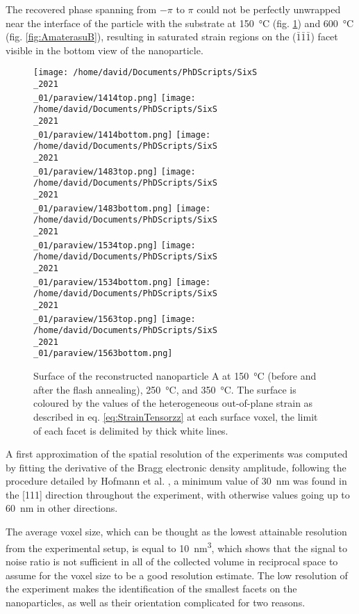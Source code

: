 The recovered phase spanning from $-\pi$ to $\pi$ could not be perfectly unwrapped near the interface of the particle with the substrate at \qty{150}{\degreeCelsius} (fig. \ref{fig:AmaterasuA}) and \qty{600}{\degreeCelsius} (fig. \ref{fig:AmaterasuB}), resulting in saturated strain regions on the ($\bar{1}\bar{1}\bar{1}$) facet visible in the bottom view of the nanoparticle.

\begin{figure}[!htb]
    \centering
    \texttt{[image: /home/david/Documents/PhDScripts/SixS\\\_2021\\\_01/paraview/1414top.png]}
    \texttt{[image: /home/david/Documents/PhDScripts/SixS\\\_2021\\\_01/paraview/1414bottom.png]}
    \texttt{[image: /home/david/Documents/PhDScripts/SixS\\\_2021\\\_01/paraview/1483top.png]}
    \texttt{[image: /home/david/Documents/PhDScripts/SixS\\\_2021\\\_01/paraview/1483bottom.png]}
    \texttt{[image: /home/david/Documents/PhDScripts/SixS\\\_2021\\\_01/paraview/1534top.png]}
    \texttt{[image: /home/david/Documents/PhDScripts/SixS\\\_2021\\\_01/paraview/1534bottom.png]}
    \texttt{[image: /home/david/Documents/PhDScripts/SixS\\\_2021\\\_01/paraview/1563top.png]}
    \texttt{[image: /home/david/Documents/PhDScripts/SixS\\\_2021\\\_01/paraview/1563bottom.png]}
    \caption{
        Surface of the reconstructed nanoparticle A at \qty{150}{\degreeCelsius} (before and after the flash annealing), \qty{250}{\degreeCelsius}, and \qty{350}{\degreeCelsius}.
        The surface is coloured by the values of the heterogeneous out-of-plane strain as described in eq. \ref{eq:StrainTensorzz} at each surface voxel, the limit of each facet is delimited by thick white lines.
    }
    \label{fig:AmaterasuA}
\end{figure}

A first approximation of the spatial resolution of the experiments was computed by fitting the derivative of the Bragg electronic density amplitude, following the procedure detailed by Hofmann et al. \cite*{Hofmann2020}, a minimum value of \qty{30}{\nm} was found in the [111] direction throughout the experiment, with otherwise values going up to \qty{60}{\nm} in other directions.

The average voxel size, which can be thought as the lowest attainable resolution from the experimental setup, is equal to \qty{10}{\nm^3}, which shows that the signal to noise ratio is not sufficient in all of the collected volume in reciprocal space to assume for the voxel size to be a good resolution estimate.
The low resolution of the experiment makes the identification of the smallest facets on the nanoparticles, as well as their orientation complicated for two reasons.

